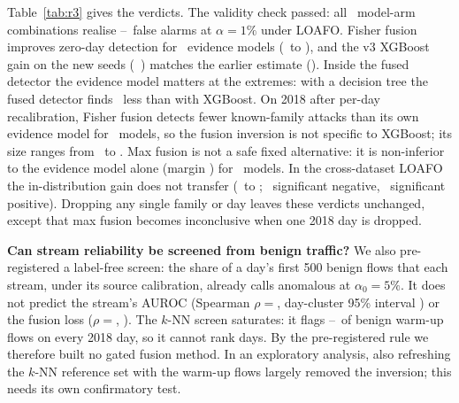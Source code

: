 \documentclass[conference]{IEEEtran}
\begin{document}
Table~\ref{tab:r3} gives the verdicts. The validity check passed: all \FactRThreeAFourCells\ model-arm combinations realise \FactRThreeAFourMin--\FactRThreeAFourMax\ false alarms at $\alpha=1\%$ under LOAFO. Fisher fusion improves zero-day detection for \FactRThreeAOneN\ evidence models (\FactRThreeAOneMin\ to \FactRThreeAOneMax), and the v3 XGBoost gain on the new seeds (\FactRThreeAOneXgbref\ \FactRThreeAOneXgbrefCi) matches the earlier estimate (\FactRaLoafoXgbMatched). Inside the fused detector the evidence model matters at the extremes: with a decision tree the fused detector finds \FactRThreeATwoDt\ less than with XGBoost. On 2018 after per-day recalibration, Fisher fusion detects fewer known-family attacks than its own evidence model for \FactRThreeAFiveN\ models, so the fusion inversion is not specific to XGBoost; its size ranges from \FactRThreeAFiveMin\ to \FactRThreeAFiveMax. Max fusion is not a safe fixed alternative: it is non-inferior to the evidence model alone (margin \FactRThreeNiMargin) for \FactRThreeASevenN\ models. In the cross-dataset LOAFO the in-distribution gain does not transfer (\FactRThreeASixMin\ to \FactRThreeASixMax; \FactRThreeASixNeg\ significant negative, \FactRThreeASixPos\ significant positive). Dropping any single family or day leaves these verdicts unchanged, except that max fusion becomes inconclusive when one 2018 day is dropped.

\textbf{Can stream reliability be screened from benign traffic?} We also pre-registered a label-free screen: the share of a day's first 500 benign flows that each stream, under its source calibration, already calls anomalous at $\alpha_0=5\%$. It does not predict the stream's AUROC (Spearman $\rho={}$\FactRThreeRsOneRho, day-cluster 95\% interval \FactRThreeRsOneCi) or the fusion loss ($\rho={}$\FactRThreeRsTwoRho, \FactRThreeRsTwoCi). The $k$-NN screen saturates: it flags \FactRThreeScreenMin--\FactRThreeScreenMax\ of benign warm-up flows on every 2018 day, so it cannot rank days. By the pre-registered rule we therefore built no gated fusion method. In an exploratory analysis, also refreshing the $k$-NN reference set with the warm-up flows largely removed the inversion; this needs its own confirmatory test.


\end{document}
